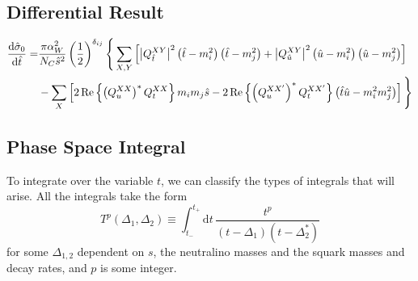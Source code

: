 \documentclass[../main.tex]{subfiles}
\begin{document}
\subsection{Differential Result}
\begin{align}
	\nonumber
	\d[\hat{t}]{\hat{\sigma}_0} = & \frac{\pi \alpha_W^2}{N_C \hat{s}^2} \pclosed{\frac{1}{2}}^{\delta_{ij}} \Bigg\{ \sum_{X,Y} \bclosed{\abs{Q^{XY}_{\hat{t}}}^2 \pclosed{\hat{t}-m_i^2}\pclosed{\hat{t}-m_j^2} + \abs{Q^{XY}_{\hat{u}}}^2 \pclosed{\hat{u}-m_i^2}\pclosed{\hat{u}-m_j^2}} \\
	                              & - \sum_X \bclosed{2\Re{\pclosed{Q_{u}^{XX}}^\ast Q_{t}^{XX}} m_i m_j \hat{s} - 2\Re{\pclosed{Q_{u}^{XX^\prime}}^\ast Q_{t}^{XX^\prime}} \pclosed{\hat{t}\hat{u} - m_i^2m_j^2}} \Bigg\}
\end{align}

\subsection{Phase Space Integral}
To integrate over the variable \(t\), we can classify the types of integrals that will arise.
All the integrals take the form
\begin{equation}
	T^p(\Delta_1, \Delta_2) \equiv \int_{t_-}^{t_+} \!\mathrm{d}t\, \frac{t^p}{(t-\Delta_1)(t-\Delta_2^\ast)}
\end{equation}
for some \(\Delta_{1,2}\) dependent on \(s\), the neutralino masses and the squark masses and decay rates, and \(p\) is some integer.
\end{document}
